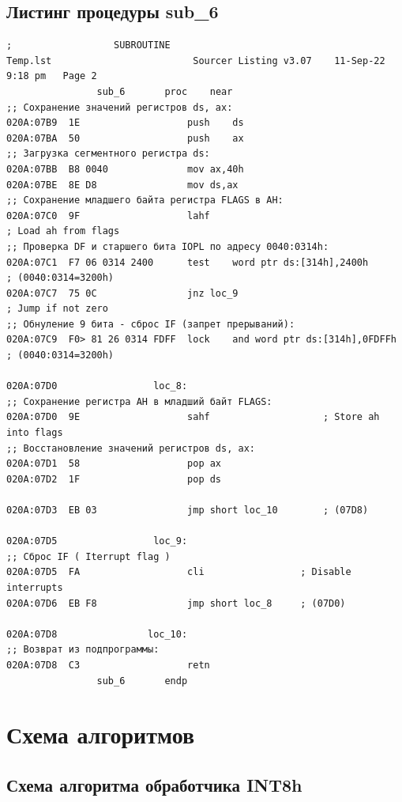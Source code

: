 \documentclass[a4paper,14pt]{article}
\begin{document}
\subsection{Листинг процедуры sub\_6}
\begin{lstlisting}[style={asm}]
;			       SUBROUTINE
Temp.lst						 Sourcer Listing v3.07    11-Sep-22   9:18 pm   Page 2
				sub_6		proc	near
;; Сохранение значений регистров ds, ax:
020A:07B9  1E					push	ds
020A:07BA  50					push	ax
;; Загрузка сегментного регистра ds:
020A:07BB  B8 0040				mov	ax,40h
020A:07BE  8E D8				mov	ds,ax
;; Сохранение младшего байта регистра FLAGS в AH:
020A:07C0  9F					lahf									; Load ah from flags
;; Проверка DF и старшего бита IOPL по адресу 0040:0314h:
020A:07C1  F7 06 0314 2400		test	word ptr ds:[314h],2400h		; (0040:0314=3200h)
020A:07C7  75 0C				jnz	loc_9								; Jump if not zero
;; Обнуление 9 бита - сброс IF (запрет прерываний):
020A:07C9  F0> 81 26 0314 FDFF	lock	and	word ptr ds:[314h],0FDFFh	; (0040:0314=3200h)

020A:07D0			      loc_8:
;; Сохранение регистра AH в младший байт FLAGS:
020A:07D0  9E					sahf					; Store ah into flags
;; Восстановление значений регистров ds, ax:
020A:07D1  58					pop	ax
020A:07D2  1F					pop	ds

020A:07D3  EB 03				jmp	short loc_10		; (07D8)

020A:07D5			      loc_9:
;; Сброс IF ( Iterrupt flag )
020A:07D5  FA					cli					; Disable interrupts
020A:07D6  EB F8				jmp	short loc_8		; (07D0)

020A:07D8			     loc_10:
;; Возврат из подпрограммы:
020A:07D8  C3					retn
				sub_6		endp
\end{lstlisting}
\clearpage
\section{Схема алгоритмов}
\subsection{Схема алгоритма обработчика INT8h}
\end{document}
